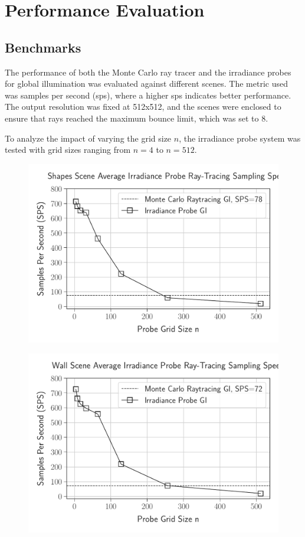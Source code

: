 \documentclass[acmtog, nonacm]{acmart}
\begin{document}
\section{Performance Evaluation}
\subsection{Benchmarks}
The performance of both the Monte Carlo ray tracer and the irradiance probes for global illumination was evaluated against different scenes. The metric used was samples per second (sps), where a higher sps indicates better performance. The output resolution was fixed at 512x512, and the scenes were enclosed to ensure that rays reached the maximum bounce limit, which was set to 8.

To analyze the impact of varying the grid size \( n \), the irradiance probe system was tested with grid sizes ranging from \( n=4 \) to \( n=512 \). 

\vspace{-10pt}

\begin{figure}[ht]
  \centering
  \includegraphics[width=0.9\linewidth]{../notebook/plot/shapes_scene_average_irradiance_probe_ray_tracing_sampling_speed.pdf}
\end{figure}

\vspace{-28pt}

\begin{figure}[ht]
  \centering
  \includegraphics[width=0.9\linewidth]{../notebook/plot/wall_scene_average_irradiance_probe_ray_tracing_sampling_speed.pdf}
\end{figure}
\end{document}
